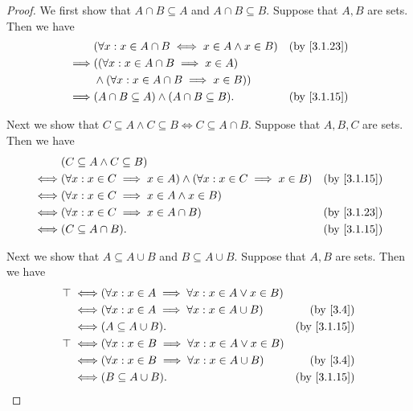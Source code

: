 \begin{proof}
  We first show that \(A \cap B \subseteq A\) and \(A \cap B \subseteq B\).
  Suppose that \(A, B\) are sets.
  Then we have
  \begin{align*}
             & (\forall x : x \in A \cap B \iff x \in A \land x \in B) & \text{(by \cref{3.1.23})} \\
    \implies & ((\forall x : x \in A \cap B \implies x \in A)                                      \\
             & \land (\forall x : x \in A \cap B \implies x \in B))                                \\
    \implies & (A \cap B \subseteq A) \land (A \cap B \subseteq B).    & \text{(by \cref{3.1.15})}
  \end{align*}

  Next we show that \(C \subseteq A \land C \subseteq B \iff C \subseteq A \cap B\).
  Suppose that \(A, B, C\) are sets.
  Then we have
  \begin{align*}
         & (C \subseteq A \land C \subseteq B)                                                                             \\
    \iff & (\forall x : x \in C \implies x \in A) \land (\forall x : x \in C \implies x \in B) & \text{(by \cref{3.1.15})} \\
    \iff & (\forall x : x \in C \implies x \in A \land x \in B)                                                            \\
    \iff & (\forall x : x \in C \implies x \in A \cap B)                                       & \text{(by \cref{3.1.23})} \\
    \iff & (C \subseteq A \cap B).                                                             & \text{(by \cref{3.1.15})}
  \end{align*}

  Next we show that \(A \subseteq A \cup B\) and \(B \subseteq A \cup B\).
  Suppose that \(A, B\) are sets.
  Then we have
  \begin{align*}
    \top \iff & (\forall x : x \in A \implies \forall x : x \in A \lor x \in B)                             \\
    \iff      & (\forall x : x \in A \implies \forall x : x \in A \cup B)       & \text{(by \cref{3.4})}    \\
    \iff      & (A \subseteq A \cup B).                                         & \text{(by \cref{3.1.15})} \\
    \top \iff & (\forall x : x \in B \implies \forall x : x \in A \lor x \in B)                             \\
    \iff      & (\forall x : x \in B \implies \forall x : x \in A \cup B)       & \text{(by \cref{3.4})}    \\
    \iff      & (B \subseteq A \cup B).                                         & \text{(by \cref{3.1.15})}
  \end{align*}


\end{proof}
